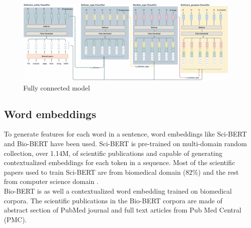 \begin{figure}[htbp]
	\centering
	\includegraphics[width=1\textwidth]{4.graphics/figures/models/pdf/fully_connected_model}
	\caption{Fully connected model }
	\label{fig:chapter05:setup}
\end{figure}

\subsection{Word embeddings}
\label{sec:chapter05:DLModels:wemb}

To generate features for each word in a sentence, word embeddings like Sci-BERT and Bio-BERT have been used. Sci-BERT is pre-trained on multi-domain random collection, over 1.14M, of scientific publications and capable of generating contextualized embeddings for each token in a sequence. Most of the scientific papers used to train Sci-BERT are from biomedical domain (82\%) and the rest from computer science domain \citep{beltagy2019scibert}. \\

Bio-BERT is as well a contextualized word embedding trained on biomedical corpora. The scientific publications in the Bio-BERT corpora are made of abstract section of PubMed journal and full text articles from Pub Med Central (PMC). 



